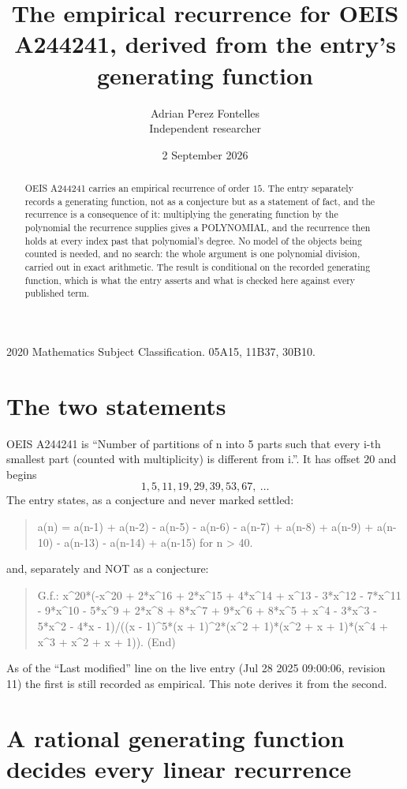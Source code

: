 \documentclass[11pt,a4paper]{article}
\title{The empirical recurrence for OEIS A244241, derived from the entry's generating function}
\author{Adrian Perez Fontelles\\ \small Independent researcher}
\date{2 September 2026}
\theoremstyle{plain}
\theoremstyle{definition}
\begin{document}
\maketitle

\begin{abstract}
OEIS A244241 carries an empirical recurrence of order $15$. The entry separately records a
generating function, not as a conjecture but as a statement of fact, and the recurrence is a
consequence of it: multiplying the generating function by the polynomial the recurrence
supplies gives a POLYNOMIAL, and the recurrence then holds at every index past that
polynomial's degree. No model of the objects being counted is needed, and no search: the
whole argument is one polynomial division, carried out in exact arithmetic. The result is
conditional on the recorded generating function, which is what the entry asserts and what is
checked here against every published term.
\end{abstract}

\noindent\small 2020 Mathematics Subject Classification. 05A15, 11B37, 30B10.\normalsize

\section{The two statements}

OEIS A244241 is ``Number of partitions of n into 5 parts such that every i-th smallest part (counted with multiplicity) is different from i.''. It has offset $20$ and begins
\[
1, 5, 11, 19, 29, 39, 53, 67,\ \dots
\]
The entry states, as a conjecture and never marked settled:
\begin{quote}
a(n) = a(n-1) + a(n-2) - a(n-5) - a(n-6) - a(n-7) + a(n-8) + a(n-9) + a(n-10) - a(n-13) - a(n-14) + a(n-15) for n > 40.
\end{quote}
and, separately and NOT as a conjecture:
\begin{quote}
G.f.: x\^{}20*(-x\^{}20 + 2*x\^{}16 + 2*x\^{}15 + 4*x\^{}14 + x\^{}13 - 3*x\^{}12 - 7*x\^{}11 - 9*x\^{}10 - 5*x\^{}9 + 2*x\^{}8 + 8*x\^{}7 + 9*x\^{}6 + 8*x\^{}5 + x\^{}4 - 3*x\^{}3 - 5*x\^{}2 - 4*x - 1)/((x - 1)\^{}5*(x + 1)\^{}2*(x\^{}2 + 1)*(x\^{}2 + x + 1)*(x\^{}4 + x\^{}3 + x\^{}2 + x + 1)). (End)
\end{quote}
As of the ``Last modified'' line on the live entry (Jul 28 2025 09:00:06, revision 11) the first is still
recorded as empirical. This note derives it from the second.

\section{A rational generating function decides every linear recurrence}
\end{document}
